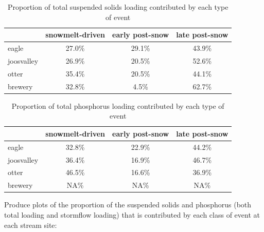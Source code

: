 \documentclass[12pt]{article}
\begin{document}
\begin{table}[h]
\begin{center}
\begin{tabular}{lccc}
  & snowmelt-driven & early post-snow & late post-snow \\ 
  \hline
eagle & 27.0\% & 29.1\% & 43.9\% \\ 
  joosvalley & 26.9\% & 20.5\% & 52.6\% \\ 
  otter & 35.4\% & 20.5\% & 44.1\% \\ 
  brewery & 32.8\% & 4.5\% & 62.7\% \\ 
  \end{tabular}
\caption{Proportion of total suspended solids loading contributed by each type of event}
\label{tab:stot}
\end{center}
\end{table}
\begin{table}[h]
\begin{center}
\begin{tabular}{lccc}
  & snowmelt-driven & early post-snow & late post-snow \\ 
  \hline
eagle & 32.8\% & 22.9\% & 44.2\% \\ 
  joosvalley & 36.4\% & 16.9\% & 46.7\% \\ 
  otter & 46.5\% & 16.6\% & 36.9\% \\ 
  brewery & NA\% & NA\% & NA\% \\ 
  \end{tabular}
\caption{Proportion of total phosphorus loading contributed by each type of event}
\label{tab:ptot}
\end{center}
\end{table}










Produce plots of the proportion of the suspended solids and phosphorus (both total loading and stormflow loading) that is contributed by each class of event at each stream site:\\
\end{document}
